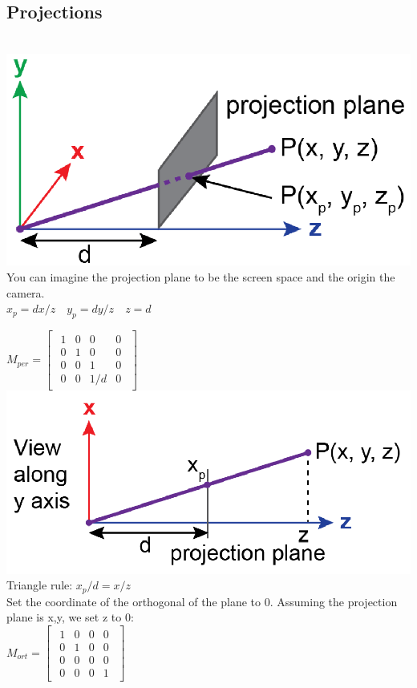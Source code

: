 \subsection*{Projections}
\\
\includegraphics[width = 0.6\columnwidth]{assets/arjun/perspective projection.png}\\
You can imagine the projection plane to be the screen space and the origin the camera.\\
$x_p = dx/z \quad y_p = dy/z \quad z = d$

$ M_{per} = 
\begin{bmatrix}
    \begin{smallmatrix}
        1 & 0 & 0 & 0\\
        0 & 1 & 0 & 0\\
        0 & 0 & 1 & 0\\
        0 & 0 & 1/d & 0
    \end{smallmatrix}
\end{bmatrix}$\\
\includegraphics[width = 0.6\columnwidth]{assets/arjun/perspective projection y axis.png}\\
Triangle rule: $x_p/d = x/z$ \\
 Set the coordinate of the orthogonal of the plane to 0. Assuming the projection plane is x,y, we set z to 0: \\
$ M_{ort} = 
\begin{bmatrix}
    \begin{smallmatrix}
        1 & 0 & 0 & 0\\
        0 & 1 & 0 & 0\\
        0 & 0 & 0 & 0 \\
        0 & 0 & 0 & 1
    \end{smallmatrix}
\end{bmatrix}$\\

